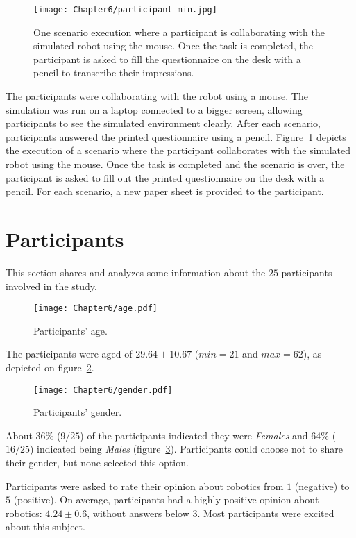 \begin{figure}
    \center
    \texttt{[image: Chapter6/participant-min.jpg]}
    \caption{One scenario execution where a participant is collaborating with the simulated robot using the mouse. Once the task is completed, the participant is asked to fill the questionnaire on the desk with a pencil to transcribe their impressions.}
    \label{fig:participant}
\end{figure}

The participants were collaborating with the robot using a mouse. The simulation was run on a laptop connected to a bigger screen, allowing participants to see the simulated environment clearly. After each scenario, participants answered the printed questionnaire using a pencil. Figure~\ref{fig:participant} depicts the execution of a scenario where the participant collaborates with the simulated robot using the mouse. Once the task is completed and the scenario is over, the participant is asked to fill out the printed questionnaire on the desk with a pencil. For each scenario, a new paper sheet is provided to the participant. 

\section{Participants}

This section shares and analyzes some information about the $25$ participants involved in the study.

\begin{figure}[h]
    \center
    \texttt{[image: Chapter6/age.pdf]}
    \caption{Participants' age.}
    \label{fig:age}
\end{figure}

The participants were aged of $29.64 \pm 10.67$ ($min=21$ and $max=62$), as depicted on figure~\ref{fig:age}. 

\begin{figure}[h]
    \center
    \texttt{[image: Chapter6/gender.pdf]}
    \caption{Participants' gender.}
    \label{fig:gender}
\end{figure}

About $36\%$ ($9/25$) of the participants indicated they were \textit{Females} and $64\%$ ($16/25$) indicated being \textit{Males} (figure~\ref{fig:gender}). Participants could choose not to share their gender, but none selected this option. 

Participants were asked to rate their opinion about robotics from $1$ (negative) to $5$ (positive). On average, participants had a highly positive opinion about robotics: $4.24 \pm 0.6$, without answers below $3$. Most participants were excited about this subject. 

